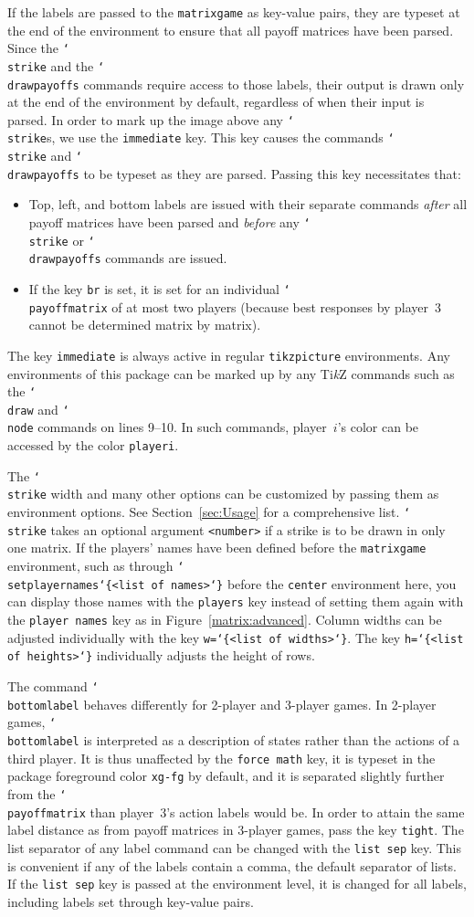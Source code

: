 \documentclass{article}
\renewcommand{\textbackslash}{\char`\\}
\def\cmd#1{\texttt{\color{cmd}\textbackslash#1}}
\def\leftbrace{\char`\{}
\def\rightbrace{\char`\}}
\def\arg#1{{\color{cmd}\leftbrace}{\color{black}#1}{\color{cmd}\rightbrace}}
\def\TikZ{Ti\emph{k}Z\xspace}
\begin{document}
If the labels are passed to the \texttt{matrixgame} as key-value pairs, they are typeset at the end of the environment to ensure that all payoff matrices have been parsed. Since the \cmd{strike} and the \cmd{drawpayoffs} commands require access to those labels, their output is drawn only at the end of the environment by default, regardless of when their input is parsed. In order to mark up the image above any \cmd{strike}s, we use the \texttt{immediate} key. This key causes the commands \cmd{strike} and \cmd{drawpayoffs} to be typeset as they are parsed. Passing this key necessitates that:
\begin{itemize}
\item Top, left, and bottom labels are issued with their separate commands \textit{after} all payoff matrices have been parsed and \textit{before} any \cmd{strike} or \cmd{drawpayoffs} commands are issued.
\item If the key \texttt{br} is set, it is set for an individual \cmd{payoffmatrix} of at most two players (because best responses by player~3 cannot be determined matrix by matrix).
\end{itemize} 
The key \texttt{immediate} is always active in regular \texttt{tikzpicture} environments. Any environments of this package can be marked up by any \TikZ commands such as the \cmd{draw} and \cmd{node} commands on lines 9--10. In such commands, player~$i$'s color can be accessed by the color \texttt{playeri}.

The \cmd{strike} width and many other options can be customized by passing them as environment options. See Section~\ref{sec:Usage} for a comprehensive list. \cmd{strike} takes an optional argument \texttt{<number>} if a strike is to be drawn in only one matrix. If the players' names have been defined before the \texttt{matrixgame} environment, such as through \cmd{setplayernames\arg{<list of names>}} before the \texttt{center} environment here, you can display those names with the  \texttt{players} key instead of setting them again with the \texttt{player names} key as in Figure~\ref{matrix:advanced}. Column widths can be adjusted individually with the key \texttt{w=\arg{<list of widths>}}. The key \texttt{h=\arg{<list of heights>}} individually adjusts the height of rows.

The command \cmd{bottomlabel} behaves differently for 2-player and 3-player games. In 2-player games, \cmd{bottomlabel} is interpreted as a description of states rather than the actions of a third player. It is thus unaffected by the \texttt{force math} key, it is typeset in the package foreground color \texttt{xg-fg} by default, and it is separated slightly further from the \cmd{payoffmatrix} than player~3's action labels would be. In order to attain the same label distance as from payoff matrices in 3-player games, pass the key \texttt{tight}. The list separator of any label command can be changed with the \texttt{list sep} key. This is convenient if any of the labels contain a comma, the default separator of lists. If the \texttt{list sep} key is passed at the environment level, it is changed for all labels, including labels set through key-value pairs.
\end{document}
